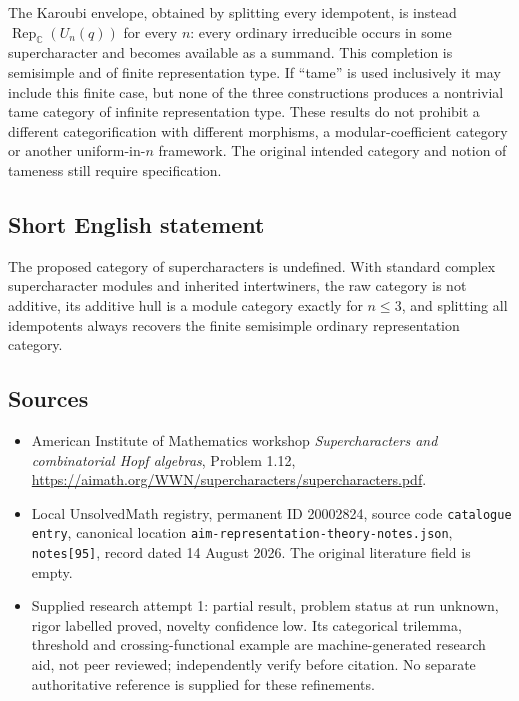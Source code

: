 \documentclass[11pt]{article}
\newcommand{\C}{\mathbb{C}}
\begin{document}
The Karoubi envelope, obtained by splitting every idempotent, is instead $\operatorname{Rep}_{\C}(U_n(q))$ for every $n$: every ordinary irreducible occurs in some supercharacter and becomes available as a summand. This completion is semisimple and of finite representation type. If ``tame'' is used inclusively it may include this finite case, but none of the three constructions produces a nontrivial tame category of infinite representation type. These results do not prohibit a different categorification with different morphisms, a modular-coefficient category or another uniform-in-$n$ framework. The original intended category and notion of tameness still require specification.
\subsection{Short English statement}
The proposed category of supercharacters is undefined. With standard complex supercharacter modules and inherited intertwiners, the raw category is not additive, its additive hull is a module category exactly for $n\le3$, and splitting all idempotents always recovers the finite semisimple ordinary representation category.
\subsection{Sources}
\begin{itemize}
\item American Institute of Mathematics workshop \emph{Supercharacters and combinatorial Hopf algebras}, Problem 1.12, \url{https://aimath.org/WWN/supercharacters/supercharacters.pdf}.
\item Local UnsolvedMath registry, permanent ID 20002824, source code \texttt{catalogue entry}, canonical location \texttt{aim-representation-theory-notes.json}, \texttt{notes[95]}, record dated 14 August 2026. The original literature field is empty.
\item Supplied research attempt 1: partial result, problem status at run unknown, rigor labelled proved, novelty confidence low. Its categorical trilemma, threshold and crossing-functional example are machine-generated research aid, not peer reviewed; independently verify before citation. No separate authoritative reference is supplied for these refinements.
\end{itemize}
\end{document}
